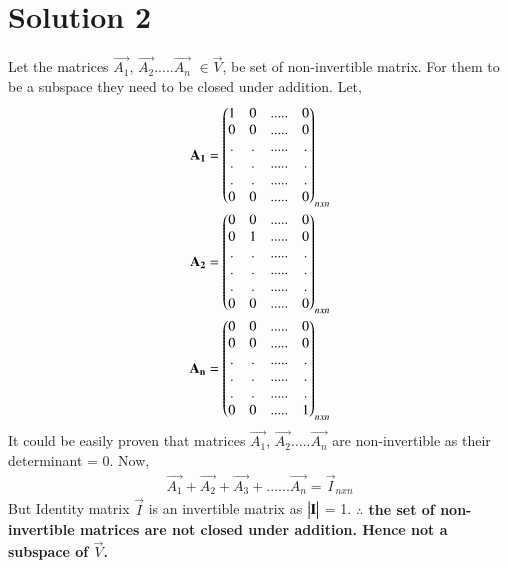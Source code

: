 \documentclass[journal,12pt,twocolumn]{IEEEtran}
\begin{document}
\section{Solution 2}
Let the matrices $\vec{A_1}$, $\vec{A_2}$.....$\vec{A_n}$ $\in \vec{V}$, be set of non-invertible matrix. For them to be a subspace they need to be closed under addition. Let,
\begin{align}
\mathbf{A_1} = \begin{pmatrix}1&0&.....&0\\0&0&.....&0\\.&.&.....&.\\.&.&.....&.\\.&.&.....&.\\0&0&.....&0\end{pmatrix}_{nxn}\\
\mathbf{A_2} = \begin{pmatrix}0&0&.....&0\\0&1&.....&0\\.&.&.....&.\\.&.&.....&.\\.&.&.....&.\\0&0&.....&0\end{pmatrix}_{nxn}\\
\mathbf{A_n}=\begin{pmatrix}0&0&.....&0\\0&0&.....&0\\.&.&.....&.\\.&.&.....&.\\.&.&.....&.\\0&0&.....&1\end{pmatrix}_{nxn}
\end{align}  
It could be easily proven that matrices $\vec{A_1}$, $\vec{A_2}$.....$\vec{A_n}$ are non-invertible as their determinant = 0. Now,
\begin{align}
\vec{A_1}+\vec{A_2}+\vec{A_3}+......\vec{A_n} = \vec{I}_{nxn}
\end{align}
But Identity matrix $\vec{I}$ is an invertible matrix as $\begin{vmatrix}\mathbf{I}\end{vmatrix}$ = 1.
\textbf{$\therefore$ the set of non-invertible matrices are not closed under addition. Hence not a subspace of $\vec{V}$.}
\end{document}
